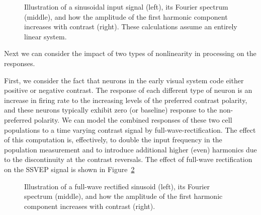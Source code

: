 \documentclass[
  letterpaper,
  DIV=11,
  numbers=noendperiod]{scrartcl}
\begin{document}
\begin{figure}


\caption{\label{fig-linear}Illustration of a sinusoidal input signal
(left), its Fourier spectrum (middle), and how the amplitude of the
first harmonic component increases with contrast (right). These
calculations assume an entirely linear system.}

\end{figure}%

Next we can consider the impact of two types of nonlinearity in
processing on the responses.

First, we consider the fact that neurons in the early visual system code
either positive or negative contrast. The response of each different
type of neuron is an increase in firing rate to the increasing levels of
the preferred contrast polarity, and these neurons typically exhibit
zero (or baseline) response to the non-preferred polarity. We can model
the combined responses of these two cell populations to a time varying
contrast signal by full-wave-rectification. The effect of this
computation is, effectively, to double the input frequency in the
population measurement and to introduce additional higher (even)
harmonics due to the discontinuity at the contrast reversals. The effect
of full-wave rectification on the SSVEP signal is shown in
Figure~\ref{fig-fullwaverectification}

\begin{figure}


\caption{\label{fig-fullwaverectification}Illustration of a full-wave
rectified sinusoid (left), its Fourier spectrum (middle), and how the
amplitude of the first harmonic component increases with contrast
(right).}

\end{figure}%
\end{document}
